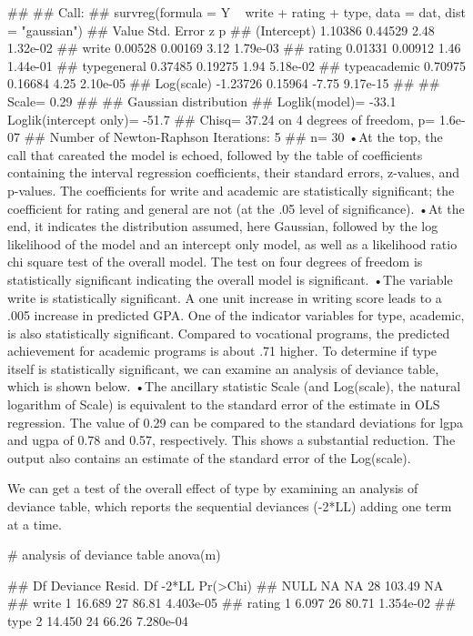 ## 
## Call:
## survreg(formula = Y ~ write + rating + type, data = dat, dist = "gaussian")
##                 Value Std. Error     z        p
## (Intercept)   1.10386    0.44529  2.48 1.32e-02
## write         0.00528    0.00169  3.12 1.79e-03
## rating        0.01331    0.00912  1.46 1.44e-01
## typegeneral   0.37485    0.19275  1.94 5.18e-02
## typeacademic  0.70975    0.16684  4.25 2.10e-05
## Log(scale)   -1.23726    0.15964 -7.75 9.17e-15
## 
## Scale= 0.29 
## 
## Gaussian distribution
## Loglik(model)= -33.1   Loglik(intercept only)= -51.7
## 	Chisq= 37.24 on 4 degrees of freedom, p= 1.6e-07 
## Number of Newton-Raphson Iterations: 5 
## n= 30
 •At the top, the call that careated the model is echoed, followed by the table of coefficients containing the interval regression coefficients, their standard errors, z-values, and p-values. The coefficients for write and academic are statistically significant; the coefficient for rating and general are not (at the .05 level of significance).
•At the end, it indicates the distribution assumed, here Gaussian, followed by the log likelihood of the model and an intercept only model, as well as a likelihood ratio chi square test of the overall model. The test on four degrees of freedom is statistically significant indicating the overall model is significant. 
•The variable write is statistically significant. A one unit increase in writing score leads to a .005 increase in predicted GPA. One of the indicator variables for type, academic, is also statistically significant. Compared to vocational programs, the predicted achievement for academic programs is about .71 higher. To determine if type itself is statistically significant, we can examine an analysis of deviance table, which is shown below.
•The ancillary statistic Scale (and Log(scale), the natural logarithm of Scale) is equivalent to the standard error of the estimate in OLS regression. The value of 0.29 can be compared to the standard deviations for lgpa and ugpa of 0.78 and 0.57, respectively. This shows a substantial reduction. The output also contains an estimate of the standard error of the Log(scale).
 
We can get a test of the overall effect of type by examining an analysis of deviance table, which reports the sequential deviances (-2*LL) adding one term at a time.
 


# analysis of deviance table
anova(m)

##        Df Deviance Resid. Df  -2*LL  Pr(>Chi)
## NULL   NA       NA        28 103.49        NA
## write   1   16.689        27  86.81 4.403e-05
## rating  1    6.097        26  80.71 1.354e-02
## type    2   14.450        24  66.26 7.280e-04

